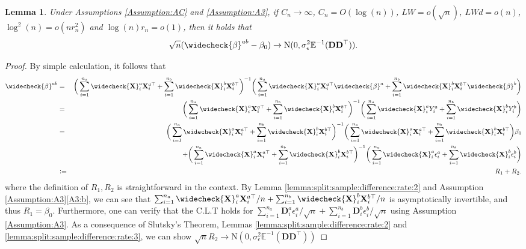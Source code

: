 \documentclass[11pt, preprint]{imsart}
\numberwithin{equation}{section}
\def \bfD{\mathbf{D}}
\def \bfX{\mathbf{X}}
\def \bfD{\mathbf{D}}
\def \ev{\mathbb{E}}
\theoremstyle{plain}
\newtheorem{lemma}{\indent Lemma}
\theoremstyle{definition}
\begin{document}
\begin{lemma}\label{lemma:split:sample:DIVE}
Under Assumptions \ref{Assumption:AC} and \ref{Assumption:A3}, if $C_n \to \infty$, $C_n=O(\log(n))$, $LW=o(\sqrt{n})$, $LWd=o(n)$, $\log^2(n)=o(nr_n^2)$ and $\log(n)r_n=o(1)$, then it holds that
\begin{equation*}
	\sqrt{n}(\widecheck{\beta}^{ab}-\beta_0)\to  \textrm{N}(0, \sigma_\epsilon^2 \ev^{-1}(\bfD\bfD^\top)).
\end{equation*}
\end{lemma}
\begin{proof}
By simple calculation, it follows that
\begin{eqnarray*}
	\widecheck{\beta}^{ab}&=&	\bigg(\sum_{i=1}^{n_a}\widecheck{\bfX}_i^a\bfX_i^{a\top}+\sum_{i=1}^{n_b}\widecheck{\bfX}_i^b\bfX_i^{b\top}\bigg)^{-1}\bigg(\sum_{i=1}^{n_a}\widecheck{\bfX}_i^a\bfX_i^{a\top}\widecheck{\beta}^a+\sum_{i=1}^{n_b}\widecheck{\bfX}_i^b\bfX_i^{b\top}\widecheck{\beta}^b\bigg)\nonumber\\
	&=&	\bigg(\sum_{i=1}^{n_a}\widecheck{\bfX}_i^a\bfX_i^{a\top}+\sum_{i=1}^{n_b}\widecheck{\bfX}_i^b\bfX_i^{b\top}\bigg)^{-1}\bigg(\sum_{i=1}^{n_a}\widecheck{\bfX}_i^aY_i^a+\sum_{i=1}^{n_b}\widecheck{\bfX}_i^bY_i^b\bigg)\nonumber\\
	&=&	\bigg(\sum_{i=1}^{n_a}\widecheck{\bfX}_i^a\bfX_i^{a\top}+\sum_{i=1}^{n_b}\widecheck{\bfX}_i^b\bfX_i^{b\top}\bigg)^{-1}\bigg(\sum_{i=1}^{n_a}\widecheck{\bfX}_i^a\bfX_i^{a\top}+\sum_{i=1}^{n_b}\widecheck{\bfX}_i^b\bfX_i^{b\top}\bigg)\beta_0\nonumber\\
	&&+	\bigg(\sum_{i=1}^{n_a}\widecheck{\bfX}_i^a\bfX_i^{a\top}+\sum_{i=1}^{n_b}\widecheck{\bfX}_i^b\bfX_i^{b\top}\bigg)^{-1}\bigg(\sum_{i=1}^{n_a}\widecheck{\bfX}_i^a\epsilon_i^a+\sum_{i=1}^{n_b}\widecheck{\bfX}_i^b\epsilon_i^b\bigg)\nonumber\\
	&:=&R_1+R_2.
\end{eqnarray*}
where the definition of $R_1, R_2$ is straightforward in the context. By Lemma \ref{lemma:split:sample:difference:rate:2}  and Assumption \ref{Assumption:A3}\ref{A3:b}, we can see that $\sum_{i=1}^{n_a}\widecheck{\bfX}_i^a\bfX_i^{a\top}/n+\sum_{i=1}^{n_b}\widecheck{\bfX}_i^b\bfX_i^{b\top}/n$ is asymptotically invertible, and thus $R_1=\beta_0$. Furthermore, one can verify that the  C.L.T holds for $\sum_{i=1}^{n_a}\bfD_i^a\epsilon_i^a/\sqrt{n}+\sum_{i=1}^{n_b}\bfD_i^b\epsilon_i^b/\sqrt{n}$ using Assumption \ref{Assumption:A3}. As a consequence of Slutsky's Theorem, Lemmas \ref{lemma:split:sample:difference:rate:2} and \ref{lemma:split:sample:difference:rate:3}, we can show $\sqrt{n}R_2\to  \textrm{N}(0, \sigma_\epsilon^2 \ev^{-1}(\bfD\bfD^\top))$
\end{proof}
\end{document}
